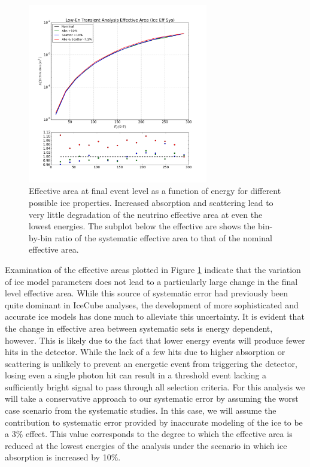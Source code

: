 \documentclass{gatech-thesis}
\begin{document}
\begin{figure}[ht]
  \begin{center}
    \includegraphics[width=0.7\textwidth,keepaspectratio]{LowEnTransient_EffArea_SysNugen_IceEffect_300GeVTrunc.png}
  \end{center}
  \caption[Ice Systematic Effective Area Comparison]{Effective area at final event level as a function of energy for different possible ice properties. Increased absorption and scattering lead to very little degradation of the neutrino effective area at even the lowest energies. The subplot below the effective are shows the bin-by-bin ratio of the systematic effective area to that of the nominal effective area.}
  \label{fig:IceSysEffArea}
\end{figure}
Examination of the effective areas plotted in Figure \ref{fig:IceSysEffArea} indicate that the variation of ice model parameters does not lead to a particularly large change in the final level effective area. While this source of systematic error had previously been quite dominant in IceCube analyses, the development of more sophisticated and accurate ice models has done much to alleviate this uncertainty. It is evident that the change in effective area between systematic sets is energy dependent, however. This is likely due to the fact that lower energy events will produce fewer hits in the detector. While the lack of a few hits due to higher absorption or scattering is unlikely to prevent an energetic event from triggering the detector, losing even a single photon hit can result in a threshold event lacking a sufficiently bright signal to pass through all selection criteria. For this analysis we will take a conservative approach to our systematic error by assuming the worst case scenario from the systematic studies. In this case, we will assume the contribution to systematic error provided by inaccurate modeling of the ice to be a 3$\%$ effect. This value corresponds to the degree to which the effective area is reduced at the lowest energies of the analysis under the scenario in which ice absorption is increased by 10$\%$.
\end{document}
